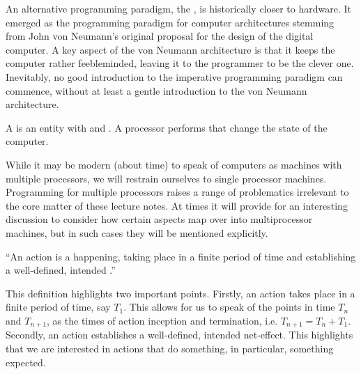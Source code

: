 
An alternative programming paradigm, the , is historically
closer to hardware. It emerged as the programming paradigm for computer
architectures stemming from John von Neumann's original proposal for the design
of the digital computer\cite{von-neumann}.  A key aspect of the von Neumann
architecture is that it keeps the computer rather feebleminded, leaving it to
the programmer to be the clever one. Inevitably, no good introduction to the
imperative programming paradigm can commence, without at least a gentle
introduction to the von Neumann architecture.

\begin{definition}

A \footnotemark is an entity with  and
. A processor performs  that change the state of
the computer.


\end{definition}

While it may be modern (about time) to speak of computers as machines with
multiple processors, we will restrain ourselves to single processor machines.
Programming for multiple processors raises a range of problematics irrelevant
to the core matter of these lecture notes. At times it will provide for an
interesting discussion to consider how certain aspects map over into
multiprocessor machines, but in such cases they will be mentioned explicitly.

\begin{definition}

``An action is a happening, taking place in a finite period of time and
establishing a well-defined, intended .''
\cite{dijkstra-introduction}

\end{definition}

This definition highlights two important points. Firstly, an action takes place
in a finite period of time, say $T_1$. This allows for us to speak of the
points in time $T_n$ and $T_{n+1}$, as the times of action inception and
termination, i.e. $T_{n+1}=T_n+T_1$. Secondly, an action establishes a
well-defined, intended net-effect. This highlights that we are interested in
actions that do something, in particular, something expected.

